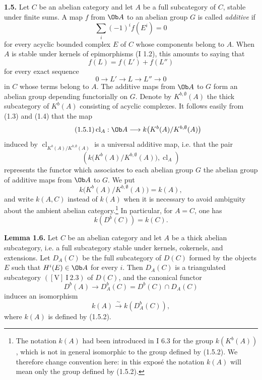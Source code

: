 \documentclass[11pt]{article}
\newcommand{\cl}{\operatorname{cl}}
\begin{document}
\textbf{1.5.} Let \(C\) be an abelian category and let \(A\) be a full subcategory of \(C\), stable under finite sums. A map \(f\) from \(\Ob A\) to an abelian group \(G\) is called \emph{additive} if
\[
 \sum_i(-1)^i f(E^i)=0
\]
for every acyclic bounded complex \(E\) of \(C\) whose components belong to \(A\). When \(A\) is stable under kernels of epimorphisms (I 1.2), this amounts to saying that
\[
 f(L)=f(L')+f(L'')
\]
for every exact sequence
\[
 0\longrightarrow L'\longrightarrow L\longrightarrow L''\longrightarrow0
\]
in \(C\) whose terms belong to \(A\). The additive maps from \(\Ob A\) to \(G\) form an abelian group depending functorially on \(G\). Denote by \(K^{b,\emptyset}(A)\) the thick subcategory of \(K^b(A)\) consisting of acyclic complexes. It follows easily from (1.3) and (1.4) that the map
\begin{equation}\tag{1.5.1}
 \cl_A:\Ob A\longrightarrow k\bigl(K^b(A)/K^{b,\emptyset}(A)\bigr)
\end{equation}
induced by \(\cl_{K^b(A)/K^{b,\emptyset}(A)}\) is a universal additive map, i.e. that the pair
\[
 \left(k\bigl(K^b(A)/K^{b,\emptyset}(A)\bigr),\cl_A\right)
\]
represents the functor which associates to each abelian group \(G\) the abelian group of additive maps from \(\Ob A\) to \(G\). We put
\begin{equation}\tag{1.5.2}
 k\bigl(K^b(A)/K^{b,\emptyset}(A)\bigr)=k(A),
\end{equation}
and write \(k(A,C)\) instead of \(k(A)\) when it is necessary to avoid ambiguity about the ambient abelian category.\footnote{The notation \(k(A)\) had been introduced in I 6.3 for the group \(k(K^b(A))\), which is not in general isomorphic to the group defined by (1.5.2). We therefore change convention here: in this exposé the notation \(k(A)\) will mean only the group defined by (1.5.2).}
In particular, for \(A=C\), one has
\begin{equation}\tag{1.5.3}
 k(D^b(C))=k(C).
\end{equation}

\textbf{Lemma 1.6.} Let \(C\) be an abelian category and let \(A\) be a thick abelian subcategory, i.e. a full subcategory stable under kernels, cokernels, and extensions. Let \(D_A(C)\) be the full subcategory of \(D(C)\) formed by the objects \(E\) such that \(H^i(E)\in\Ob A\) for every \(i\). Then \(D_A(C)\) is a triangulated subcategory \(([\mathrm V]\ \mathrm I\ 2.3)\) of \(D(C)\), and the canonical functor
\[
 D^b(A)\longrightarrow D_A^b(C)=D^b(C)\cap D_A(C)
\]
induces an isomorphism
\[
 k(A)\xrightarrow{\sim} k(D_A^b(C)),
\]
where \(k(A)\) is defined by (1.5.2).
\end{document}

